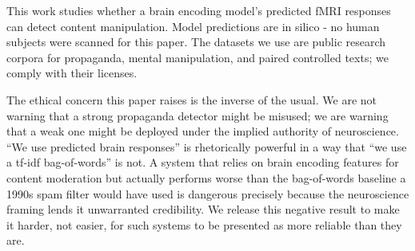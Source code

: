 \documentclass[11pt]{article}
\begin{document}
This work studies whether a brain encoding model's predicted fMRI responses can detect content manipulation. Model predictions are in silico - no human subjects were scanned for this paper. The datasets we use are public research corpora for propaganda, mental manipulation, and paired controlled texts; we comply with their licenses.

The ethical concern this paper raises is the inverse of the usual. We are not warning that a strong propaganda detector might be misused; we are warning that a weak one might be deployed under the implied authority of neuroscience. ``We use predicted brain responses'' is rhetorically powerful in a way that ``we use a tf-idf bag-of-words'' is not. A system that relies on brain encoding features for content moderation but actually performs worse than the bag-of-words baseline a 1990s spam filter would have used is dangerous precisely because the neuroscience framing lends it unwarranted credibility. We release this negative result to make it harder, not easier, for such systems to be presented as more reliable than they are.



\end{document}
